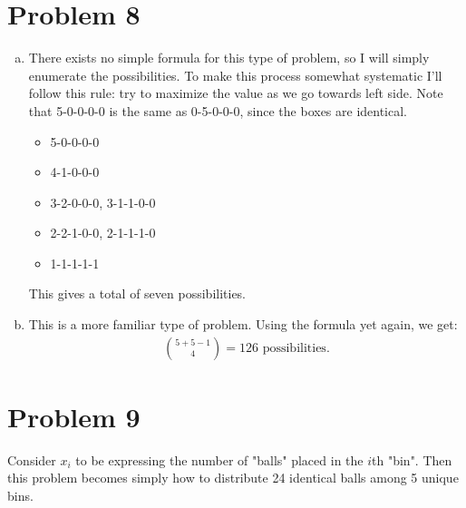 \documentclass[11pt]{article}
\begin{document}
\section*{Problem 8}
	\begin{enumerate}[(a)]
	\item
		There exists no simple formula for this type of problem, so I will simply enumerate the possibilities. To make this process somewhat 
		systematic I'll follow this rule: try to maximize the value as we go towards left side. Note that 5-0-0-0-0 is the same as 0-5-0-0-0, since 
		the boxes are identical.
		\begin{itemize}
			\item
				5-0-0-0-0
			\item
				4-1-0-0-0
			\item
				3-2-0-0-0, 3-1-1-0-0
			\item
				2-2-1-0-0, 2-1-1-1-0
			\item
				1-1-1-1-1
		\end{itemize}
		This gives a total of seven possibilities.
	
	\item
		This is a more familiar type of problem. Using the formula yet again, we get:
		\begin{align*}
		\binom{5+5-1}{4} = 126 \text{ possibilities.}
		\end{align*}
			
			
	\end{enumerate}

\section*{Problem 9}
	Consider $x_i$ to be expressing the number of "balls" placed in the $i$th "bin". Then this problem becomes simply how to distribute 24 
	identical balls among 5 unique bins.
	
\end{document}
